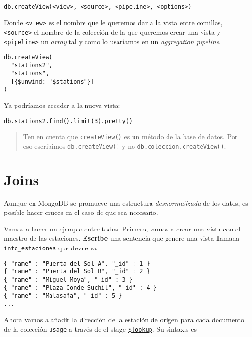\documentclass[]{article}
\begin{document}
\begin{verbatim}
db.createView(<view>, <source>, <pipeline>, <options>)
\end{verbatim}

Donde \texttt{\textless{}view\textgreater{}} es el nombre que le
queremos dar a la vista entre comillas,
\texttt{\textless{}source\textgreater{}} el nombre de la colección de la
que queremos crear una vista y
\texttt{\textless{}pipeline\textgreater{}} un \emph{array} tal y como lo
usaríamos en un \emph{aggregation pipeline}.

\begin{verbatim}
db.createView(
  "stations2",
  "stations",
  [{$unwind: "$stations"}]
)
\end{verbatim}

Ya podríamos acceder a la nueva vista:

\begin{verbatim}
db.stations2.find().limit(3).pretty()
\end{verbatim}

\begin{quote}
Ten en cuenta que \texttt{createView()} es un método de la base de
datos. Por eso escribimos \texttt{db.createView()} y no
\texttt{db.coleccion.createView()}.
\end{quote}

\hypertarget{joins}{%
\section{Joins}\label{joins}}

Aunque en MongoDB se promueve una estructura \emph{desnormalizada} de
los datos, es posible hacer cruces en el caso de que sea necesario.

Vamos a hacer un ejemplo entre todos. Primero, vamos a crear una vista
con el maestro de las estaciones. \textbf{Escribe} una sentencia que
genere una vista llamada \texttt{info\_estaciones} que devuelva

\begin{verbatim}
{ "name" : "Puerta del Sol A", "_id" : 1 }
{ "name" : "Puerta del Sol B", "_id" : 2 }
{ "name" : "Miguel Moya", "_id" : 3 }
{ "name" : "Plaza Conde Suchil", "_id" : 4 }
{ "name" : "Malasaña", "_id" : 5 }
...
\end{verbatim}

Ahora vamos a añadir la dirección de la estación de origen para cada
documento de la colección \texttt{usage} a través de el stage
\href{https://docs.mongodb.com/manual/reference/operator/aggregation/lookup/}{\texttt{\$lookup}}.
Su sintaxis es
\end{document}
